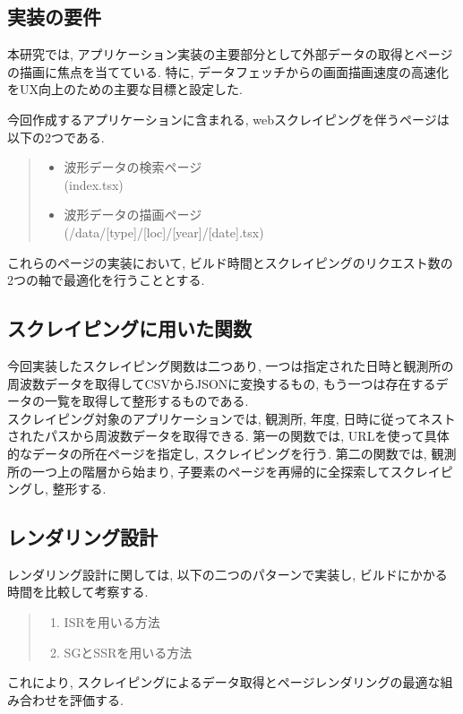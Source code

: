 \subsection{実装の要件}
本研究では, アプリケーション実装の主要部分として外部データの取得とページの描画に焦点を当てている. 
特に, データフェッチからの画面描画速度の高速化をUX向上のための主要な目標と設定した. 

今回作成するアプリケーションに含まれる, webスクレイピングを伴うページは以下の2つである. 
\begin{quote}
	\begin{itemize}
		\item 波形データの検索ページ\\(index.tsx)
		\item 波形データの描画ページ\\(/data/[type]/[loc]/[year]/[date].tsx)
	\end{itemize}
\end{quote}
これらのページの実装において, ビルド時間とスクレイピングのリクエスト数の2つの軸で最適化を行うこととする. 

\subsection{スクレイピングに用いた関数}
今回実装したスクレイピング関数は二つあり, 一つは指定された日時と観測所の周波数データを取得してCSVからJSONに変換するもの, もう一つは存在するデータの一覧を取得して整形するものである. \\
スクレイピング対象のアプリケーションでは, 観測所, 年度, 日時に従ってネストされたパスから周波数データを取得できる. 
第一の関数では, URLを使って具体的なデータの所在ページを指定し, スクレイピングを行う. 
第二の関数では, 観測所の一つ上の階層から始まり, 子要素のページを再帰的に全探索してスクレイピングし, 整形する. 

\subsection{レンダリング設計}
レンダリング設計に関しては, 以下の二つのパターンで実装し, ビルドにかかる時間を比較して考察する. 
\begin{quote}
	\begin{enumerate}
		\item ISRを用いる方法
		\item SGとSSRを用いる方法
	\end{enumerate}
\end{quote}
これにより, スクレイピングによるデータ取得とページレンダリングの最適な組み合わせを評価する. 

